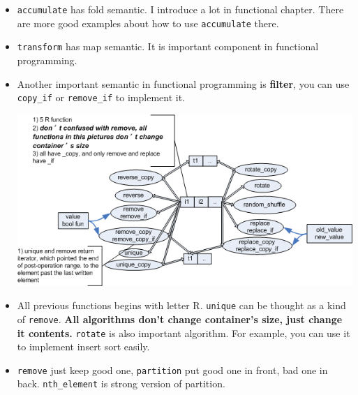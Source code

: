 \documentclass[a4paper,11pt,twoside]{book}
\begin{document}
\begin{itemize}

	\item \texttt{accumulate} has fold semantic. I introduce a lot in functional chapter. There are more good examples about how to use \texttt{accumulate} there. 
	
	\item \texttt{transform} has map semantic. It is important component in functional programming.
	
	\item Another important semantic in functional programming is \textbf{filter}, you can use \texttt{copy\_if} or \texttt{remove\_if} to implement it.
	
	\begin{center}
	\includegraphics[width=0.9\linewidth]{pics/std3.png}
	\end{center}
	
	\item All previous functions begins with letter R. \texttt{unique} can be thought as a kind of \texttt{remove}.\textbf{ All algorithms don't change container's size, just change it contents.} \texttt{rotate} is also important algorithm. For example, you can use it to implement insert sort easily. 
	
	\item \texttt{remove} just keep good one, \texttt{partition} put good one in front, bad one in back. \texttt{nth\_element} is strong version of partition.
	
\end{itemize}
	
\end{document}
